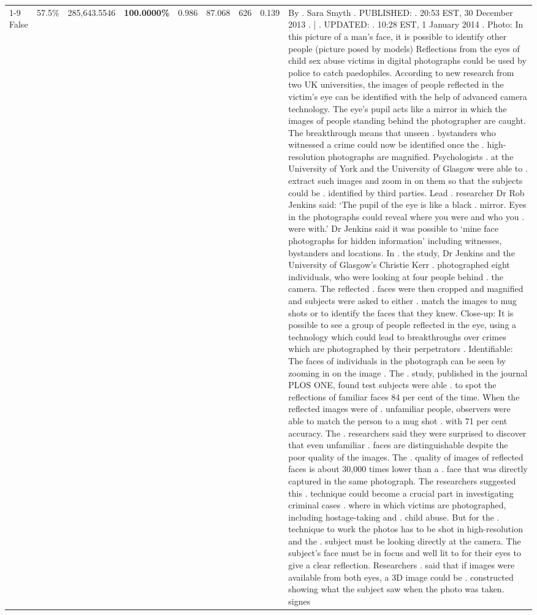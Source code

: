 \begin{table}[H]
\begin{tabular}{lllrlllll}
\cline{1-9} \cline{2-9}
False & 57.5\% & \color{red} 285,643.5546 & \bfseries \color{red} 100.0000\% & 0.986 & 87.068 & 626 & 0.139 & By . Sara Smyth . PUBLISHED: . 20:53 EST, 30 December 2013 . | . UPDATED: . 10:28 EST, 1 January 2014 . Photo: In this picture of a man's face, it is possible to identify other people (picture posed by models) Reflections from the eyes of child sex abuse victims in digital photographs could be used by police to catch paedophiles. According to new research from two UK universities, the images of people reflected in the victim's eye can be identified with the help of advanced camera technology. The eye's pupil acts like a mirror in which the images of people standing behind the photographer are caught. The breakthrough means that unseen . bystanders who witnessed a crime could now be identified once the . high-resolution photographs are magnified. Psychologists . at the University of York and the University of Glasgow were able to . extract such images and zoom in on them so that the subjects could be . identified by third parties. Lead . researcher Dr Rob Jenkins said: ‘The pupil of the eye is like a black . mirror. Eyes in the photographs could reveal where you were and who you . were with.' Dr Jenkins said it was possible to ‘mine face photographs for hidden information' including witnesses, bystanders and locations. In . the study, Dr Jenkins and the University of Glasgow's Christie Kerr . photographed eight individuals, who were looking at four people behind . the camera. The reflected . faces were then cropped and magnified and subjects were asked to either . match the images to mug shots or to identify the faces that they knew. Close-up: It is possible to see a group of people reflected in the eye, using a technology which could lead to breakthroughs over crimes which are photographed by their perpetrators . Identifiable: The faces of individuals in the photograph can be seen by zooming in on the image . The . study, published in the journal PLOS ONE, found test subjects were able . to spot the reflections of familiar faces 84 per cent of the time. When the reflected images were of . unfamiliar people, observers were able to match the person to a mug shot . with 71 per cent accuracy. The . researchers said they were surprised to discover that even unfamiliar . faces are distinguishable despite the poor quality of the images. The . quality of images of reflected faces is about 30,000 times lower than a . face that was directly captured in the same photograph. The researchers suggested this . technique could become a crucial part in investigating criminal cases . where in which victims are photographed, including hostage-taking and . child abuse. But for the . technique to work the photos has to be shot in high-resolution and the . subject must be looking directly at the camera. The subject's face must be in focus and well lit to for their eyes to give a clear reflection. Researchers . said that if images were available from both eyes, a 3D image could be . constructed showing what the subject saw when the photo was taken. signes \\

\end{tabular}
\end{table}

